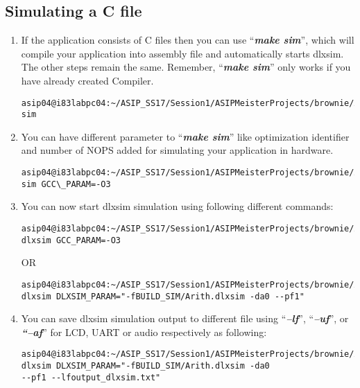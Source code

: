 \subsection{Simulating a C file}
\begin{enumerate}[resume]
\item If the application consists of C files then you can use
	``\emph{\textbf{make sim}}'', which will compile your application into
	assembly file and automatically starts dlxsim. The other steps remain
	the same. Remember, ``\emph{\textbf{make sim}}'' only works if you
	have already created Compiler.
\begin{lstlisting}
asip04@i83labpc04:~/ASIP_SS17/Session1/ASIPMeisterProjects/brownie/Applications/Arith:$make
sim
\end{lstlisting}
\item You can have different parameter to ``\emph{\textbf{make sim}}'' like
	optimization identifier and number of NOPS added for simulating your
	application in hardware.
\begin{lstlisting}
asip04@i83labpc04:~/ASIP_SS17/Session1/ASIPMeisterProjects/brownie/Applications/Arith:$make
sim GCC\_PARAM=-O3
\end{lstlisting}
\item	You can now start dlxsim simulation using following different
	commands:
\begin{lstlisting}
asip04@i83labpc04:~/ASIP_SS17/Session1/ASIPMeisterProjects/brownie/Applications/Arith:$make dlxsim GCC_PARAM=-O3
\end{lstlisting}
OR
\begin{lstlisting}
asip04@i83labpc04:~/ASIP_SS17/Session1/ASIPMeisterProjects/brownie/Applications/Arith:$make
dlxsim DLXSIM_PARAM="-fBUILD_SIM/Arith.dlxsim -da0 --pf1"
\end{lstlisting}
\color{red}
\item \normalcolor You can save dlxsim simulation output to different file using
	``\emph{\textbf{--lf}}'', ``\emph{\textbf{--uf}}'', or
	\emph{\textbf{``--af}}'' for LCD, UART or audio respectively as
	following:
\begin{lstlisting}
asip04@i83labpc04:~/ASIP_SS17/Session1/ASIPMeisterProjects/brownie/Applications/Arith:$make
dlxsim DLXSIM_PARAM="-fBUILD_SIM/Arith.dlxsim -da0
--pf1 --lfoutput_dlxsim.txt"
\end{lstlisting}
\end{enumerate}